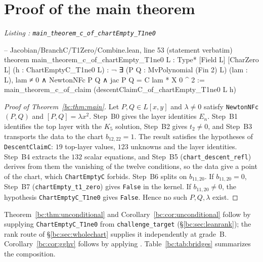 \documentclass[a4paper,11pt]{article}
\newcounter{leanlisting}
\newenvironment{leanlisting}[2]{%
  \refstepcounter{leanlisting}\label{#2}%
  \begin{center}\textit{\small\color{inksecondary}Listing \theleanlisting: #1}\end{center}%
  \Verbatim[breaklines=true,breakanywhere=true,fontsize=\footnotesize,frame=single,framesep=4pt,rulecolor=\color{borderstrong},fillcolor=\color{bgsubtle}]%
}{%
  \endVerbatim%
}
\theoremstyle{jsplain}
\theoremstyle{jsdef}
\theoremstyle{jsrem}
\begin{document}
\section{Proof of the main theorem}\label{bc:sec:proof}

\begin{leanlisting}{\texttt{main\_theorem\_c\_of\_\allowbreak chartEmpty\_T1ne0}}{bc:lst:main}
-- Jacobian/BranchC/T1Zero/Combine.lean, line 53 (statement verbatim)
theorem main_theorem_c_of_chartEmpty_T1ne0 {L : Type*} [Field L] [CharZero L]
    (h : ChartEmptyC_T1ne0 L) :
    ¬ ∃ (P Q : MvPolynomial (Fin 2) L) (lam : L), lam ≠ 0 ∧ NewtonNFc P Q ∧
      jac P Q = C lam * X 0 ^ 2 :=
  main_theorem_c_of_claim (descentClaimC_of_chartEmpty_T1ne0 L h)
\end{leanlisting}

\begin{proof}[Proof of Theorem~\ref{bc:thm:main}]
Let $P,Q\in L[x,y]$ and $\lambda\neq0$ satisfy \texttt{NewtonNFc}$(P,Q)$ and $[P,Q]=\lambda x^2$. Step~B0 gives the layer identities $E_n$. Step~B1 identifies the top layer with the $K_5$ solution, Step~B2 gives $t_2\neq0$, and Step~B3 transports the data to the chart $b_{12,22}=1$. The result satisfies the hypotheses of \texttt{DescentClaimC}: $19$ top-layer values, $123$ unknowns and the layer identities. Step~B4 extracts the $132$ scalar equations, and Step~B5 (\texttt{chart\_\allowbreak{}descent\_\allowbreak{}refl}) derives from them the vanishing of the twelve conditions, so the data give a point of the chart, which \texttt{ChartEmptyC} forbids. Step~B6 splits on $b_{11,20}$. If $b_{11,20}=0$, Step~B7 (\texttt{chartEmpty\_\allowbreak{}t1\_\allowbreak{}zero}) gives \texttt{False} in the kernel. If $b_{11,20}\neq0$, the hypothesis \texttt{ChartEmptyC\_\allowbreak{}T1ne0} gives \texttt{False}. Hence no such $P,Q,\lambda$ exist.
\end{proof}

Theorem~\ref{bc:thm:unconditional} and Corollary~\ref{bc:cor:unconditional} follow by supplying \texttt{ChartEmptyC\_\allowbreak{}T1ne0} from \texttt{challenge\_\allowbreak{}target} (\S\ref{bc:sec:leanrank}); the rank route of \S\ref{bc:sec:wholechart} supplies it independently at grade~B. Corollary~\ref{bc:cor:gghv} follows by applying \cite[Prop.~4.3]{GGHV}. Table~\ref{bc:tab:bridges} summarizes the composition.
\end{document}
